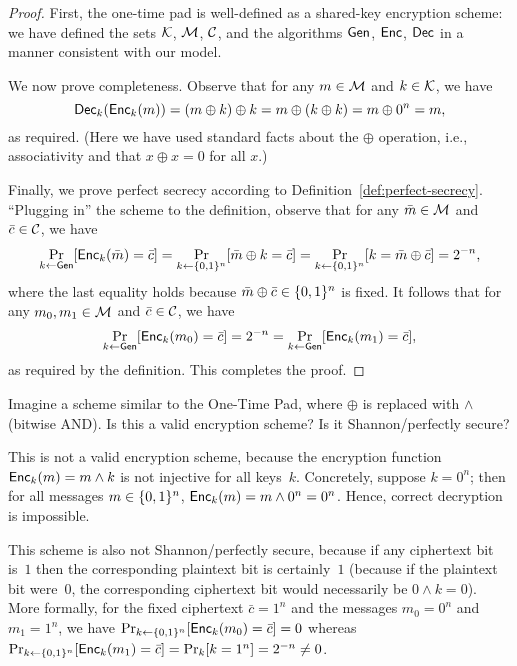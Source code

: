 \documentclass[11pt]{article}
\begin{document}
\begin{proof}
  First, the one-time pad is well-defined as a shared-key encryption
  scheme: we have defined the sets $\mathcal{K}$, $\mathcal{M}$,
  $\mathcal{C}$, and the algorithms $\mathsf{Gen}$, $\mathsf{Enc}$, $\mathsf{Dec}$ in a
  manner consistent with our model.

  We now prove completeness.  Observe that for any $m \in \mathcal{M}$
  and $k \in \mathcal{K}$, we have \[ \mathsf{Dec}_{k}(\mathsf{Enc}_{k}(m)) = (m
  \oplus k) \oplus k = m \oplus (k \oplus k) = m \oplus 0^{n} = m, \]
  as required.  (Here we have used standard facts about the $\oplus$
  operation, i.e., associativity and that $x \oplus x = 0$ for all
  $x$.)

  Finally, we prove perfect secrecy according to
  Definition~\ref{def:perfect-secrecy}.  ``Plugging in'' the scheme to
  the definition, observe that for any $\bar{m} \in \mathcal{M}$ and
  $\bar{c} \in \mathcal{C}$, we have \[ \Pr_{k \gets
    \mathsf{Gen}}[\mathsf{Enc}_{k}(\bar{m}) = \bar{c}] = \Pr_{k \gets
    \{0,1\}^{n}}[\bar{m} \oplus k = \bar{c}] = \Pr_{k \gets \{0,1\}^{n}}[k =
  \bar{m} \oplus \bar{c}] = 2^{-n}, \] where the last equality holds
  because $\bar{m} \oplus \bar{c} \in \{0,1\}^{n}$ is fixed. It follows
  that for any $m_{0}, m_{1} \in \mathcal{M}$ and $\bar{c} \in
  \mathcal{C}$, we have \[ \Pr_{k \gets \mathsf{Gen}}[\mathsf{Enc}_{k}(m_{0}) =
  \bar{c}] = 2^{-n} = \Pr_{k \gets \mathsf{Gen}}[\mathsf{Enc}_{k}(m_{1}) =
  \bar{c}], \] as required by the definition.  This completes the
  proof.
\end{proof}

\begin{question}
  Imagine a scheme similar to the One-Time Pad, where \(\oplus\) is
  replaced with \(\land\) (bitwise AND). Is this a valid encryption
  scheme? Is it Shannon/perfectly secure?
\end{question}

\begin{answer}
  This is not a valid encryption scheme, because the encryption
  function \(\mathsf{Enc}_k(m) = m \land k\) is not injective for all
  keys~$k$. Concretely, suppose \(k = 0^n\); then for all messages
  \(m \in \{0,1\}^n\), \(\mathsf{Enc}_k(m) = m \land 0^n = 0^n\). Hence,
  correct decryption is impossible.

  This scheme is also not Shannon/perfectly secure, because if any
  ciphertext bit is~$1$ then the corresponding plaintext bit is
  certainly~$1$ (because if the plaintext bit were~$0$, the
  corresponding ciphertext bit would necessarily be $0 \land k =
  0$). More formally, for the fixed ciphertext $\bar{c}=1^{n}$ and the
  messages $m_{0}=0^{n}$ and $m_{1} = 1^{n}$, we have
  $\Pr_{k \gets \{0,1\}^{n}}[\mathsf{Enc}_{k}(m_{0})=\bar{c}] = 0$ whereas
  $\Pr_{k \gets \{0,1\}^{n}}[\mathsf{Enc}_{k}(m_{1})=\bar{c}] =
  \Pr_{k}[k=1^{n}] = 2^{-n} \neq 0$.
\end{answer}
\end{document}

